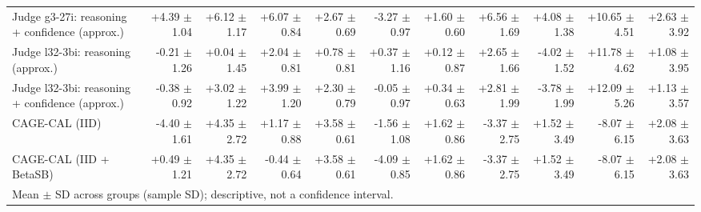 \begin{tabular}{lrrrrrrrrrr}
Judge g3-27i: reasoning + confidence (approx.) & +4.39 {\scriptsize $\pm$ 1.04} & +6.12 {\scriptsize $\pm$ 1.17} & +6.07 {\scriptsize $\pm$ 0.84} & +2.67 {\scriptsize $\pm$ 0.69} & -3.27 {\scriptsize $\pm$ 0.97} & +1.60 {\scriptsize $\pm$ 0.60} & +6.56 {\scriptsize $\pm$ 1.69} & +4.08 {\scriptsize $\pm$ 1.38} & +10.65 {\scriptsize $\pm$ 4.51} & +2.63 {\scriptsize $\pm$ 3.92} \\
Judge l32-3bi: reasoning (approx.) & -0.21 {\scriptsize $\pm$ 1.26} & +0.04 {\scriptsize $\pm$ 1.45} & +2.04 {\scriptsize $\pm$ 0.81} & +0.78 {\scriptsize $\pm$ 0.81} & +0.37 {\scriptsize $\pm$ 1.16} & +0.12 {\scriptsize $\pm$ 0.87} & +2.65 {\scriptsize $\pm$ 1.66} & -4.02 {\scriptsize $\pm$ 1.52} & +11.78 {\scriptsize $\pm$ 4.62} & +1.08 {\scriptsize $\pm$ 3.95} \\
Judge l32-3bi: reasoning + confidence (approx.) & -0.38 {\scriptsize $\pm$ 0.92} & +3.02 {\scriptsize $\pm$ 1.22} & +3.99 {\scriptsize $\pm$ 1.20} & +2.30 {\scriptsize $\pm$ 0.79} & -0.05 {\scriptsize $\pm$ 0.97} & +0.34 {\scriptsize $\pm$ 0.63} & +2.81 {\scriptsize $\pm$ 1.99} & -3.78 {\scriptsize $\pm$ 1.99} & +12.09 {\scriptsize $\pm$ 5.26} & +1.13 {\scriptsize $\pm$ 3.57} \\
CAGE-CAL (IID) & -4.40 {\scriptsize $\pm$ 1.61} & +4.35 {\scriptsize $\pm$ 2.72} & +1.17 {\scriptsize $\pm$ 0.88} & +3.58 {\scriptsize $\pm$ 0.61} & -1.56 {\scriptsize $\pm$ 1.08} & +1.62 {\scriptsize $\pm$ 0.86} & -3.37 {\scriptsize $\pm$ 2.75} & +1.52 {\scriptsize $\pm$ 3.49} & -8.07 {\scriptsize $\pm$ 6.15} & +2.08 {\scriptsize $\pm$ 3.63} \\
CAGE-CAL (IID + BetaSB) & +0.49 {\scriptsize $\pm$ 1.21} & +4.35 {\scriptsize $\pm$ 2.72} & -0.44 {\scriptsize $\pm$ 0.64} & +3.58 {\scriptsize $\pm$ 0.61} & -4.09 {\scriptsize $\pm$ 0.85} & +1.62 {\scriptsize $\pm$ 0.86} & -3.37 {\scriptsize $\pm$ 2.75} & +1.52 {\scriptsize $\pm$ 3.49} & -8.07 {\scriptsize $\pm$ 6.15} & +2.08 {\scriptsize $\pm$ 3.63} \\
\bottomrule
\multicolumn{11}{l}{\scriptsize Mean $\pm$ SD across groups (sample SD); descriptive, not a confidence interval.} \\
\end{tabular}
